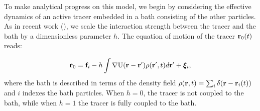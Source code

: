 \documentclass[amsmath,preprintnumbers,10pt,nofootinbib,prl,twocolumn]{revtex4-1}
\newcommand{\A}{\text{\tiny{A}}}
\newcommand{\T}{\text{T}}
\newcommand{\U}{\text{U}}
\begin{document}


To make analytical progress on this model, we begin by considering the effective dynamics of an active tracer embedded in a bath consisting of the other particles. As in recent work (\cite{Demery2011, Demery2014}), we scale the interaction strength between the tracer and the bath by a dimensionless parameter $h$. The equation of motion of the tracer ${\bf r}_0(t)$ reads:

\begin{equation}\label{eq:dyn_pert}
\dot{\bf r}_0 = {\bf f}_i - h \int  \nabla \U({\bf r}  - {\bf r}') \rho ({\bf r}', t)  d {\bf r}' + {\bm \xi}_i ,
\end{equation}
where the bath is described in terms of the density field $\rho ( {\bf r} , t) = \sum_i \delta({\bf r} - {\bf r}_i(t))$ and $i$ indexes the bath particles. When $h=0$, the tracer is not coupled to the bath, while when $h=1$ the tracer is fully coupled to the bath.
\end{document}
